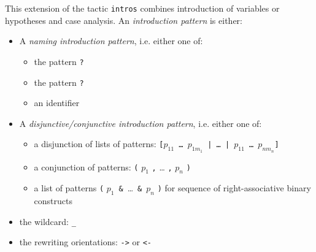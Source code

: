 This extension of the tactic {\tt intros} combines introduction of
variables or hypotheses and case analysis. An {\em introduction pattern} is
either:
\begin{itemize}
\item A {\em naming introduction pattern}, i.e. either one of:
  \begin{itemize}
  \item the pattern \texttt{?}
  \item the pattern \texttt{?\ident}
  \item an identifier
  \end{itemize}
\item A {\em disjunctive/conjunctive introduction pattern}, i.e. either one of:
  \begin{itemize}
  \item a disjunction of lists of patterns:
  {\tt [$p_{11}$ {\ldots} $p_{1m_1}$ | {\ldots} | $p_{11}$ {\ldots} $p_{nm_n}$]}
  \item a conjunction of patterns: {\tt (} $p_1$ {\tt ,} {\ldots} {\tt ,} $p_n$ {\tt )}
  \item a list of patterns {\tt (} $p_1$\ {\tt \&}\ {\ldots}\ {\tt \&}\ $p_n$ {\tt )}
   for sequence of right-associative binary constructs
  \end{itemize}
\item the wildcard: {\tt \_}
\item the rewriting orientations: {\tt ->} or {\tt <-}
\end{itemize}

